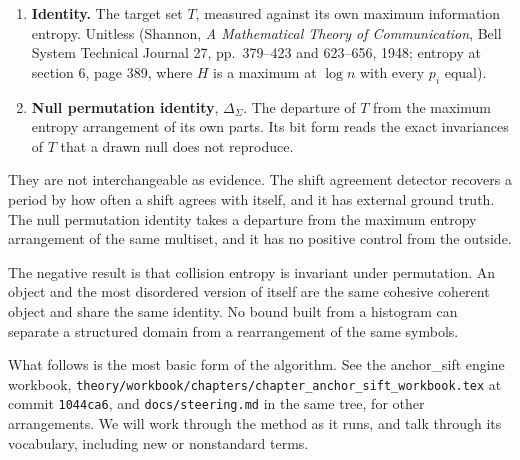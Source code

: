 \begin{enumerate}
  \item \textbf{Identity.} The target set $T$, measured against its own maximum information
    entropy. Unitless (Shannon, \emph{A Mathematical Theory of Communication}, Bell System
    Technical Journal 27, pp.~379--423 and 623--656, 1948; entropy at section 6, page 389, where
    $H$ is a maximum at $\log n$ with every $p_i$ equal).
  \item \textbf{Null permutation identity}, $\Delta_{\Sigma}$. The departure of $T$ from the
    maximum entropy arrangement of its own parts. Its bit form reads the exact invariances of $T$
    that a drawn null does not reproduce.
\end{enumerate}

They are not interchangeable as evidence. The shift agreement detector recovers a period by how
often a shift agrees with itself, and it has external ground truth. The null permutation identity
takes a departure from the maximum entropy arrangement of the same multiset, and it has no positive
control from the outside.

The negative result is that collision entropy is invariant under permutation. An object and the
most disordered version of itself are the same cohesive coherent object and share the same
identity. No bound built from a histogram can separate a structured domain from a rearrangement of
the same symbols.

What follows is the most basic form of the algorithm. See the anchor\_sift engine workbook,
\texttt{theory/\allowbreak{}workbook/\allowbreak{}chapters/\allowbreak{}chapter\_\allowbreak{}anchor\_\allowbreak{}sift\_\allowbreak{}workbook.\allowbreak{}tex}
at commit \texttt{1044ca6}, and \texttt{docs/\allowbreak{}steering.md} in the same tree, for other
arrangements. We will work through the method as it runs, and talk through its
vocabulary, including new or nonstandard terms.
\cleardoublepage
